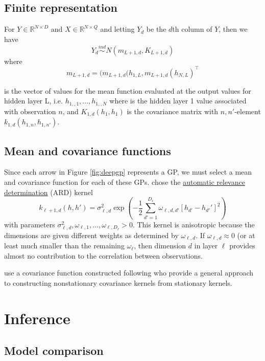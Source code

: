 \documentclass{article}
\newcommand{\ind}{\stackrel{ind}{\sim}}
\newcommand{\1}{\mathbbm{1}}
\begin{document}
\subsection{Finite representation}

For $Y \in \mathbb{R}^{N \times D}$ and $X\in \mathbb{R}^{N\times Q}$
and letting $Y_d$ be the $d$th column of $Y$,
then we have
\[
Y_d \ind N(m_{L+1,d}, K_{L+1,d})
\]
where
\[
m_{L+1,d} = (m_{L+1,d}(h_{1,L},m_{L+1,d}(h_{N,L})^\top
\]

is the vector of values for the mean function evaluated at the output values for
hidden layer L, i.e. $h_{1,,1},\ldots,h_{1,,N}$ where
is the hidden layer 1 value associated with observation $n$, and
$K_{1,d}(h_1,h_1)$ is the covariance matrix with $n,n'$-element
$k_{1,d}(h_{1,n},h_{1,n'})$.


\subsection{Mean and covariance functions}

Since each arrow in Figure \ref{fig:deepgp} represents a GP,
we must select a mean and covariance function for each of these GPs.
\cite{damianou2013deep} chose the \underline{automatic relevance determination} (ARD)
kernel
\[
k_{\ell+1,d}(h,h') =
\sigma^2_{\ell,d} \exp\left(-\frac{1}{2} \sum_{d'=1}^{D_\ell} \omega_{\ell,d,d'} \left[ h_{d'} - h_{d'}' \right]^2\right)
\]
with parameters $\sigma^2_{\ell,d},\omega_{\ell,1},\ldots,\omega_{\ell,D_\ell} > 0$.
This kernel is anisotropic because the dimensions are given different weights
as determined by $\omega_{\ell,d}$.
If $\omega_{\ell,d} \approx 0$ (or at least much smaller than the remaining $\omega_{\ell}$,
then dimension $d$ in layer $\ell$ provides almost no contribution to the correlation between
observations.

\cite{dunlop2018deep} use a covariance function constructed following
\cite{paciorek2004nonstationary} who provide a general approach to constructing
nonstationary covariance kernels from stationary kernels.




\section{Inference}

\subsection{Model comparison}
\end{document}
